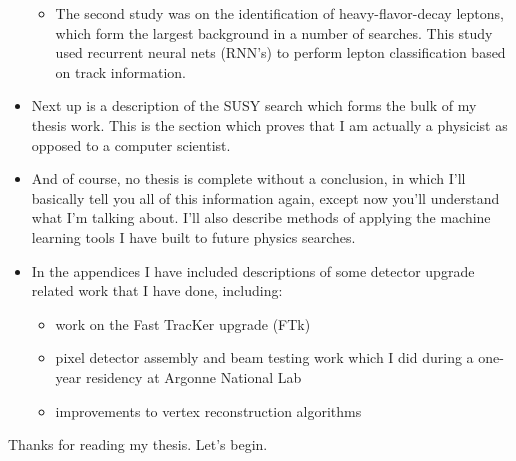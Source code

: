 \begin{itemize}
\begin{itemize}
        \item The second study was on the identification of heavy-flavor-decay leptons, which form the largest background in a number of searches. This study used recurrent neural nets (RNN's) to perform lepton classification based on track information.

    \end{itemize}
    
    \item Next up is a description of the SUSY search which forms the bulk of my thesis work. This is the section which proves that I am actually a physicist as opposed to a computer scientist.
    
    \item And of course, no thesis is complete without a conclusion, in which I'll basically tell you all of this information again, except now you'll understand what I'm talking about. I'll also describe methods of applying the machine learning tools I have built to future physics searches.
    
    \item In the appendices I have included descriptions of some detector upgrade related work that I have done, including:
    
    \begin{itemize}
        \item work on the Fast TracKer upgrade (FTk)
        \item pixel detector assembly and beam testing work which I did during a one-year residency at Argonne National Lab
        \item improvements to vertex reconstruction algorithms
    \end{itemize}

\end{itemize}

Thanks for reading my thesis. Let's begin.